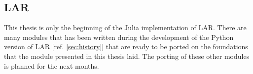 \subsection{LAR}
This thesis is only the beginning of the Julia implementation
of LAR. There are many modules that has been written 
during the development of the Python version of LAR
[ref. \ref{sec:history}] that are ready to be ported
on the foundations that the module presented in this thesis
laid. The porting of these other modules is planned for the
next months.